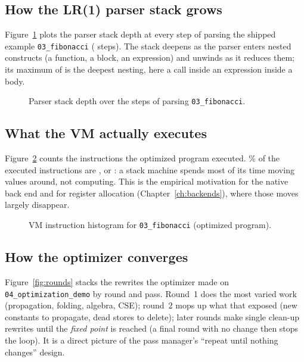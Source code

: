 \subsection{How the LR(1) parser stack grows}
Figure~\ref{fig:parsedepth} plots the parser stack depth at every step of parsing the shipped example \texttt{03\_fibonacci} (\VisParseSteps{} steps). The stack deepens as the parser enters nested constructs (a function, a block, an expression) and unwinds as it reduces them; its maximum of \VisParseMaxDepth{} is the deepest nesting, here a call inside an expression inside a  body.

\begin{figure}[H]\centering

\caption{Parser stack depth over the \VisParseSteps{} steps of parsing \texttt{03\_fibonacci}.}\label{fig:parsedepth}
\end{figure}

\subsection{What the VM actually executes}
Figure~\ref{fig:opcodes} counts the instructions the optimized program executed. \VisOpShare{}\% of the \VisOpTotal{} executed instructions are ,  or : a stack machine spends most of its time moving values around, not computing. This is the empirical motivation for the native back end and for register allocation (Chapter~\ref{ch:backends}), where those moves largely disappear.

\begin{figure}[H]\centering

\caption{VM instruction histogram for \texttt{03\_fibonacci} (optimized program).}\label{fig:opcodes}
\end{figure}

\subsection{How the optimizer converges}
Figure~\ref{fig:rounds} stacks the \VisRewrites{} rewrites the optimizer made on \texttt{04\_optimization\_demo} by round and pass. Round~1 does the most varied work (propagation, folding, algebra, CSE); round~2 mops up what that exposed (new constants to propagate, dead stores to delete); later rounds make single clean-up rewrites until the \emph{fixed point} is reached (a final round with no change then stops the loop). It is a direct picture of the pass manager's ``repeat until nothing changes'' design.

